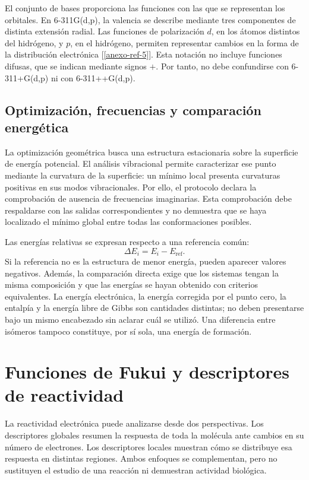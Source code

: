 El conjunto de bases proporciona las funciones con las que se representan los orbitales. En 6-311G(d,p), la valencia se describe mediante tres componentes de distinta extensión radial. Las funciones de polarización $d$, en los átomos distintos del hidrógeno, y $p$, en el hidrógeno, permiten representar cambios en la forma de la distribución electrónica [\ref{anexo-ref-5}]. Esta notación no incluye funciones difusas, que se indican mediante signos $+$. Por tanto, no debe confundirse con 6-311+G(d,p) ni con 6-311++G(d,p).

\section{Optimización, frecuencias y comparación energética}
La optimización geométrica busca una estructura estacionaria sobre la superficie de energía potencial. El análisis vibracional permite caracterizar ese punto mediante la curvatura de la superficie: un mínimo local presenta curvaturas positivas en sus modos vibracionales. Por ello, el protocolo declara la comprobación de ausencia de frecuencias imaginarias. Esta comprobación debe respaldarse con las salidas correspondientes y no demuestra que se haya localizado el mínimo global entre todas las conformaciones posibles.

Las energías relativas se expresan respecto a una referencia común:
\begin{equation}
 \Delta E_i=E_i-E_{\mathrm{ref}}.
\end{equation}
Si la referencia no es la estructura de menor energía, pueden aparecer valores negativos. Además, la comparación directa exige que los sistemas tengan la misma composición y que las energías se hayan obtenido con criterios equivalentes. La energía electrónica, la energía corregida por el punto cero, la entalpía y la energía libre de Gibbs son cantidades distintas; no deben presentarse bajo un mismo encabezado sin aclarar cuál se utilizó. Una diferencia entre isómeros tampoco constituye, por sí sola, una energía de formación.

\chapter{Funciones de Fukui y descriptores de reactividad}
\label{ap:reactividad}

La reactividad electrónica puede analizarse desde dos perspectivas. Los descriptores globales resumen la respuesta de toda la molécula ante cambios en su número de electrones. Los descriptores locales muestran cómo se distribuye esa respuesta en distintas regiones. Ambos enfoques se complementan, pero no sustituyen el estudio de una reacción ni demuestran actividad biológica.

